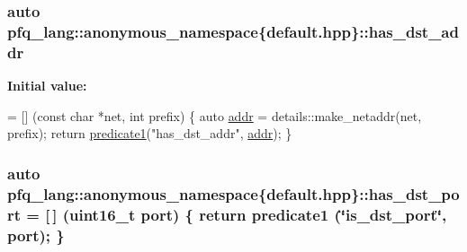 \hypertarget{namespacepfq__lang_1_1anonymous__namespace_02default_8hpp_03_af223a0513ceffa69c0b8535a7cca12da}{
\subsubsection[{has\+\_\+dst\+\_\+addr}]{\setlength{\rightskip}{0pt plus 5cm}auto pfq\+\_\+lang\+::anonymous\+\_\+namespace\{default.\+hpp\}\+::has\+\_\+dst\+\_\+addr}}\label{namespacepfq__lang_1_1anonymous__namespace_02default_8hpp_03_af223a0513ceffa69c0b8535a7cca12da}
{\bfseries Initial value\+:}
\begin{DoxyCode}
= [] (\textcolor{keyword}{const} \textcolor{keywordtype}{char} *net, \textcolor{keywordtype}{int} prefix)
        \{
            \textcolor{keyword}{auto} \hyperlink{namespacepfq__lang_1_1anonymous__namespace_02default_8hpp_03_aafce8334d1be83bff9a2115439c8c453}{addr} = details::make\_netaddr(net, prefix);
            \textcolor{keywordflow}{return} \hyperlink{namespacepfq__lang_ae23a03cee94b5ddfde4a8d2e5c521f0e}{predicate1}(\textcolor{stringliteral}{"has\_dst\_addr"}, \hyperlink{namespacepfq__lang_1_1anonymous__namespace_02default_8hpp_03_aafce8334d1be83bff9a2115439c8c453}{addr});
        \}
\end{DoxyCode}
\hypertarget{namespacepfq__lang_1_1anonymous__namespace_02default_8hpp_03_accc3aed36db0c762dd6c95f3706c8741}{
\subsubsection[{has\+\_\+dst\+\_\+port}]{\setlength{\rightskip}{0pt plus 5cm}auto pfq\+\_\+lang\+::anonymous\+\_\+namespace\{default.\+hpp\}\+::has\+\_\+dst\+\_\+port = \mbox{[}$\,$\mbox{]} (uint16\+\_\+t {\bf port}) \{ return {\bf predicate1} (\char`\"{}is\+\_\+dst\+\_\+port\char`\"{}, port); \}}}\label{namespacepfq__lang_1_1anonymous__namespace_02default_8hpp_03_accc3aed36db0c762dd6c95f3706c8741}
